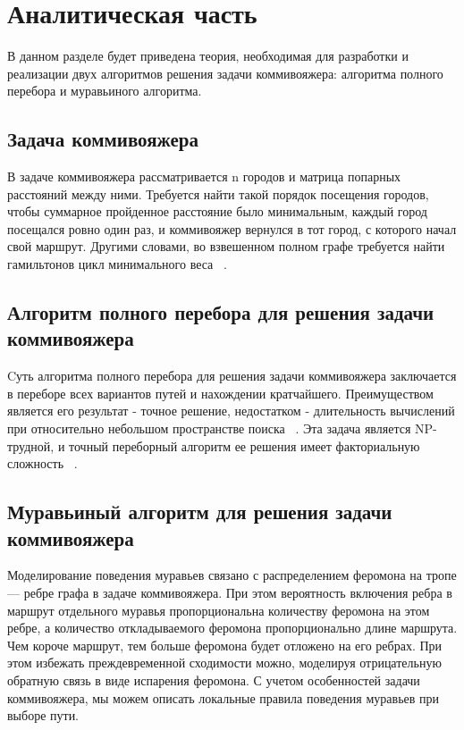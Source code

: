 \chapter{Аналитическая часть}

В данном разделе будет приведена теория, необходимая для разработки и реализации двух алгоритмов решения задачи коммивояжера: алгоритма полного перебора и муравьиного алгоритма.

\section{Задача коммивояжера}

В задаче коммивояжера рассматривается n городов  и матрица попарных расстояний между ними. Требуется найти такой порядок  посещения  городов,  чтобы  суммарное  пройденное  расстояние было минимальным, каждый город посещался ровно один раз, и  коммивояжер  вернулся  в  тот  город,  с  которого  начал  свой  маршрут.  Другими  словами,  во  взвешенном  полном  графе  требуется найти гамильтонов цикл минимального веса ~\cite{second_article}. 

\section{Алгоритм полного перебора для решения задачи коммивояжера}

Cуть алгоритма полного перебора для решения задачи коммивояжера заключается в переборе всех вариантов путей и нахождении кратчайшего. Преимуществом является его результат - точное решение, недостатком - длительность вычислений при относительно небольшом пространстве поиска ~\cite{third_article}. Эта задача является NP-трудной, и точный переборный алгоритм ее решения имеет факториальную сложность ~\cite{first_article}.


\section{Муравьиный алгоритм для решения задачи коммивояжера}

Моделирование поведения муравьев связано с распределением феромона на тропе — ребре графа в задаче коммивояжера. При этом вероятность включения ребра в маршрут отдельного муравья пропорциональна количеству феромона на этом ребре, а количество откладываемого феромона пропорционально длине маршрута. Чем короче маршрут, тем больше феромона будет отложено на его ребрах. При этом избежать преждевременной сходимости можно, моделируя отрицательную обратную связь в виде испарения феромона. С учетом особенностей задачи коммивояжера, мы можем описать локальные правила поведения муравьев при выборе пути.

